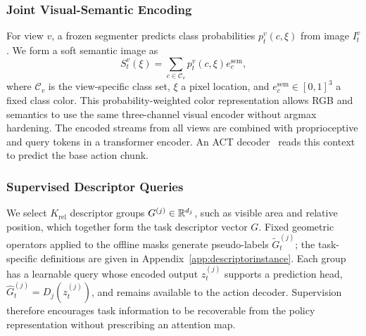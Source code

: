\subsubsection{Joint Visual-Semantic Encoding}
For view $v$, a frozen segmenter predicts class probabilities $p_t^v(c,\xi)$ from image $I_t^v$.
We form a soft semantic image as
\begin{equation}
 S_t^v(\xi)=\sum_{c\in\mathcal C_v}p_t^v(c,\xi)e_c^{\mathrm{sem}},
 \label{eq:methodsoftsem}
\end{equation}
where $\mathcal C_v$ is the view-specific class set, $\xi$ a pixel location, and $e_c^{\mathrm{sem}}\in[0,1]^3$ a fixed class color.
This probability-weighted color representation allows RGB and semantics to use the same three-channel visual encoder without argmax hardening.
The encoded streams from all views are combined with proprioceptive and query tokens in a transformer encoder.
An ACT decoder~\cite{zhao2023act} reads this context to predict the base action chunk.

\subsubsection{Supervised Descriptor Queries}
We select $K_{\mathrm{rel}}$ descriptor groups $G^{(j)}\in\mathbb R^{d_j}$, such as visible area and relative position, which together form the task descriptor vector $G$.
Fixed geometric operators applied to the offline masks generate pseudo-labels $\widetilde G_t^{(j)}$; the task-specific definitions are given in Appendix~\ref{app:descriptorinstance}.
Each group has a learnable query whose encoded output $z_t^{(j)}$ supports a prediction head,
$\widehat G_t^{(j)}=D_j(z_t^{(j)})$, and remains available to the action decoder.
Supervision therefore encourages task information to be recoverable from the policy representation without prescribing an attention map.

